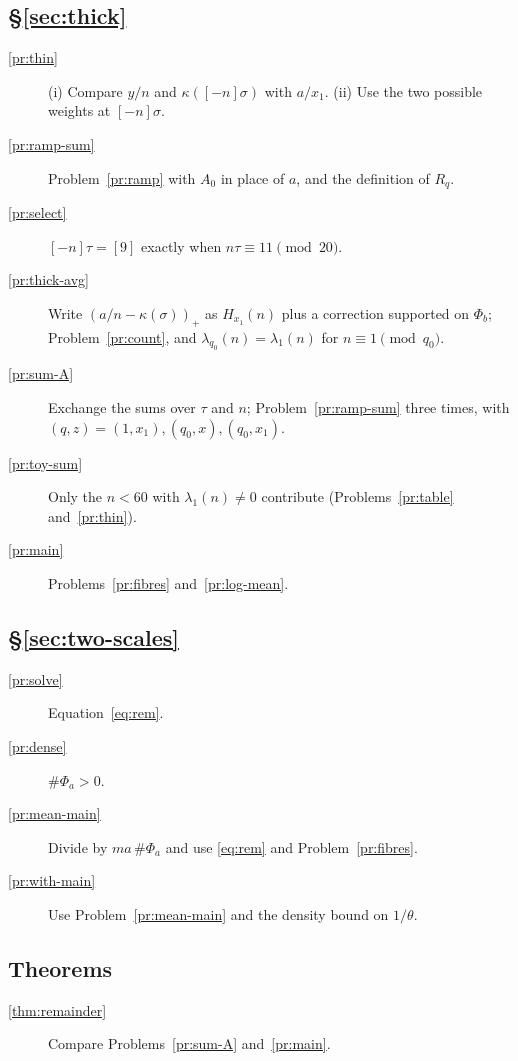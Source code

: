 \documentclass[reqno]{amsart}
\theoremstyle{definition}
\theoremstyle{plain}
\begin{document}
\subsection*{\S\ref{sec:thick}}
\begin{description}
\item[\ref{pr:thin}] (i) Compare \(y/n\) and \(\kappa([-n]\sigma)\) with \(a/x_1\).  (ii) Use the two possible weights at \([-n]\sigma\).
\item[\ref{pr:ramp-sum}] Problem~\ref{pr:ramp} with \(A_0\) in place of \(a\), and the definition of \(R_q\).
\item[\ref{pr:select}] \([-n]\tau = [9]\) exactly when \(n\tau \equiv 11 \pmod{20}\).
\item[\ref{pr:thick-avg}] Write \((a/n - \kappa(\sigma))_+\) as \(H_{x_1}(n)\) plus a correction supported on \(\Phi_b\); Problem~\ref{pr:count}, and \(\lambda_{q_0}(n) = \lambda_1(n)\) for \(n \equiv 1 \pmod{q_0}\).
\item[\ref{pr:sum-A}] Exchange the sums over \(\tau\) and \(n\); Problem~\ref{pr:ramp-sum} three times, with \((q, z) = (1, x_1), (q_0, x), (q_0, x_1)\).
\item[\ref{pr:toy-sum}] Only the \(n < 60\) with \(\lambda_1(n) \ne 0\) contribute (Problems~\ref{pr:table} and~\ref{pr:thin}).
\item[\ref{pr:main}] Problems~\ref{pr:fibres} and~\ref{pr:log-mean}.
\end{description}

\subsection*{\S\ref{sec:two-scales}}
\begin{description}
\item[\ref{pr:solve}] Equation~\eqref{eq:rem}.
\item[\ref{pr:dense}] \(\#\Phi_a > 0\).
\item[\ref{pr:mean-main}] Divide by \(ma\,\#\Phi_a\) and use \eqref{eq:rem} and Problem~\ref{pr:fibres}.
\item[\ref{pr:with-main}] Use Problem~\ref{pr:mean-main} and the density bound on \(1/\theta\).
\end{description}

\subsection*{Theorems}
\begin{description}
\item[\ref{thm:remainder}] Compare Problems~\ref{pr:sum-A} and~\ref{pr:main}.
\end{description}
\end{document}
